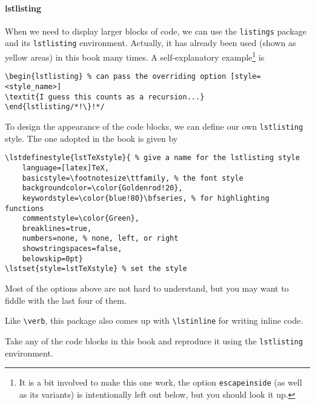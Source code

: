 \paragraph{lstlisting}
When we need to display larger blocks of code, we can use the \verb|listings| package and its \verb|lstlisting| environment. Actually, it has already been used (shown as yellow areas) in this book many times. A self-explanatory example\footnote{It is a bit involved to make this one work, the option \texttt{escapeinside} (as well as its variants) is intentionally left out below, but you should look it up.} is
\begin{lstlisting}
\begin{lstlisting} % can pass the overriding option [style=<style_name>]
\textit{I guess this counts as a recursion...}
\end{lstlisting/*!\}!*/
\end{lstlisting}
To design the appearance of the code blocks, we can define our own \verb|lstlisting| style. The one adopted in the book is given by
\begin{lstlisting}
\lstdefinestyle{lstTeXstyle}{ % give a name for the lstlisting style
    language=[latex]TeX, 
    basicstyle=\footnotesize\ttfamily, % the font style
    backgroundcolor=\color{Goldenrod!20},
    keywordstyle=\color{blue!80}\bfseries, % for highlighting functions
    commentstyle=\color{Green},
    breaklines=true, 
    numbers=none, % none, left, or right
    showstringspaces=false,
    belowskip=0pt}
\lstset{style=lstTeXstyle} % set the style
\end{lstlisting}
Most of the options above are not hard to understand, but you may want to fiddle with the last four of them.

Like \texttt{\textbackslash verb}, this package also comes up with \texttt{\textbackslash lstinline} for writing inline code.

\begin{exercisebox}
\begin{Exercise}
Take any of the code blocks in this book and reproduce it using the \verb|lstlisting| environment.
\end{Exercise}
\end{exercisebox}